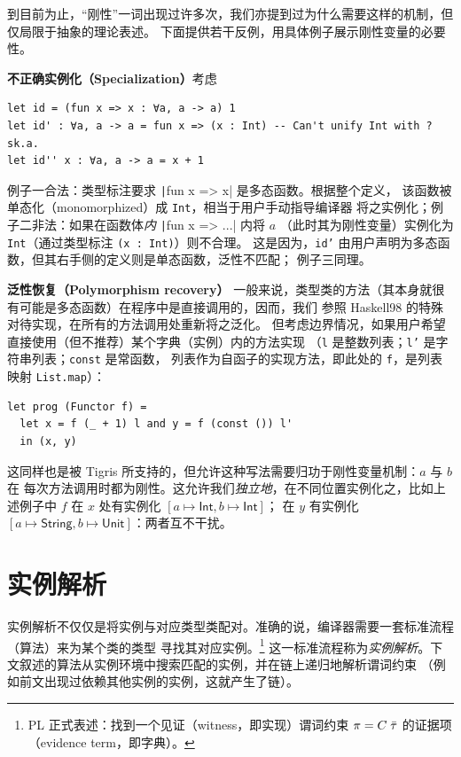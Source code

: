 \begin{remark}[反例：为什么我们需要刚性变量]
  到目前为止，“刚性”一词出现过许多次，我们亦提到过为什么需要这样的机制，但仅局限于抽象的理论表述。
  下面提供若干反例，用具体例子展示刚性变量的必要性。

  \textbf{不正确实例化（Specialization）}考虑
      \begin{verbatim}
let id = (fun x => x : ∀a, a -> a) 1
let id' : ∀a, a -> a = fun x => (x : Int) -- Can't unify Int with ?sk.a.
let id'' x : ∀a, a -> a = x + 1
      \end{verbatim}
  例子一合法：类型标注要求 \texttt|fun x => x| 是多态函数。根据整个定义，
  该函数被单态化（monomorphized）成 \texttt{Int}，相当于用户手动指导编译器
  将之实例化；例子二非法：如果在函数体\emph{内} \texttt|fun x => ...| 内将 $a$
  （此时其为刚性变量）实例化为 \texttt{Int}（通过类型标注 \texttt{(x : Int)}）则不合理。
  这是因为，\texttt{id'} 由用户声明为多态函数，但其右手侧的定义则是单态函数，泛性不匹配；
  例子三同理。

  \textbf{泛性恢复（Polymorphism recovery）}\quad
  一般来说，类型类的方法（其本身就很有可能是多态函数）在程序中是直接调用的，因而，我们
  参照 Haskell98 的特殊对待实现，在所有的方法调用处重新将之泛化。
  但考虑边界情况，如果用户希望直接使用（但不推荐）某个字典（实例）内的方法实现
  （\texttt{l} 是整数列表；\texttt{l'} 是字符串列表；\texttt{const} 是常函数，
  列表作为自函子的实现方法，即此处的 \texttt{f}，是列表映射 \texttt{List.map}）：
      \begin{verbatim}
let prog (Functor f) =
  let x = f (_ + 1) l and y = f (const ()) l'
  in (x, y)
      \end{verbatim}
  这同样也是被 Tigris 所支持的，但允许这种写法需要归功于刚性变量机制：$a$ 与 $b$ 在
  每次方法调用时都为刚性。这允许我们\emph{独立地}，在不同位置实例化之，比如上述例子中
  $f$ 在 $x$ 处有实例化 \([a\mapsto \mathsf{Int}, b\mapsto\mathsf{Int}]\)；
  在 $y$ 有实例化 \([a\mapsto \mathsf{String}, b\mapsto\mathsf{Unit}]\)：两者互不干扰。
\end{remark}

\section{实例解析}
实例解析不仅仅是将实例与对应类型类配对。准确的说，编译器需要一套标准流程（算法）来为某个类的类型
寻找其对应实例。\footnote{
  PL 正式表述：找到一个见证（witness，即实现）谓词约束 \(\pi = C\;\bar{\tau}\)
  的证据项（evidence term，即字典）。
} 这一标准流程称为\emph{实例解析}。下文叙述的算法从实例环境中搜索匹配的实例，并在链上递归地解析谓词约束
（例如前文出现过依赖其他实例的实例，这就产生了链）。

